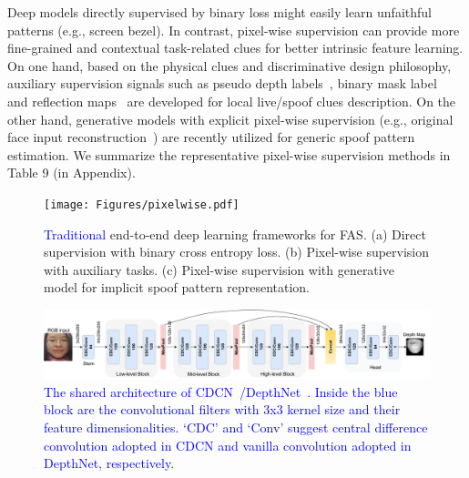 \documentclass[10pt,journal,compsoc]{IEEEtran}
\begin{document}
Deep models directly supervised by binary loss might easily learn unfaithful patterns (e.g., screen bezel). In contrast, pixel-wise supervision can provide more fine-grained and contextual task-related clues for better intrinsic feature learning. On one hand, based on the physical clues and discriminative design philosophy, auxiliary supervision signals such as pseudo depth labels~\cite{Atoum2018Face,Liu2018Learning}, binary mask label~\cite{george2019deep,liu2019deep,sun2020face} and reflection maps~\cite{yu2020face,kim2019basn} are developed for local live/spoof clues description. On the other hand, generative models with explicit pixel-wise supervision (e.g., original face input reconstruction~\cite{mohammadi2020improving,liu2020physics}) are recently utilized for generic spoof pattern estimation. We summarize the representative pixel-wise supervision methods in Table 9 (in Appendix). 







 
\begin{figure}
\centering
\texttt{[image: Figures/pixelwise.pdf]}
  \caption{ 
   \textcolor{blue}{Traditional} end-to-end deep learning frameworks for FAS. (a) Direct supervision with binary cross entropy loss. (b) Pixel-wise supervision with auxiliary tasks. (c) Pixel-wise supervision with generative model for implicit spoof pattern representation.
  }
\label{fig:pixelwise}
\end{figure}



\begin{figure}
\centering
\includegraphics[scale=0.45]{Figures/DepthNetCDCN.pdf}
  \caption{ 
   \textcolor{blue}{The shared architecture of CDCN~\cite{yu2020searching}/DepthNet~\cite{Liu2018Learning}. Inside the blue block are the convolutional filters with 3x3 kernel size and their feature dimensionalities. `CDC' and `Conv' suggest central difference convolution adopted in CDCN and vanilla convolution adopted in DepthNet, respectively.}
  }
\label{fig:cdcn}
\end{figure}
\end{document}
